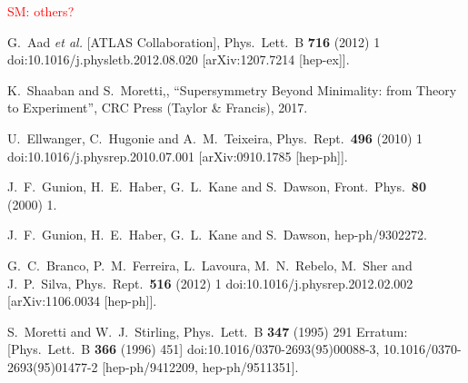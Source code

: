 \documentclass[12pt]{article}
\begin{document}
{\textcolor{red}{SM: others?}}


\begin{thebibliography}{99}

  G.~Aad {\it et al.} [ATLAS Collaboration],
  Phys.\ Lett.\ B {\bf 716} (2012) 1
  doi:10.1016/j.physletb.2012.08.020
  [arXiv:1207.7214 [hep-ex]].

  K.~Shaaban and S.~Moretti,,
  ``Supersymmetry Beyond Minimality: from Theory to Experiment'',
  CRC Press (Taylor \& Francis), 2017.

  U.~Ellwanger, C.~Hugonie and A.~M.~Teixeira,
  Phys.\ Rept.\  {\bf 496} (2010) 1
  doi:10.1016/j.physrep.2010.07.001
  [arXiv:0910.1785 [hep-ph]].


  J.~F.~Gunion, H.~E.~Haber, G.~L.~Kane and S.~Dawson,
  Front.\ Phys.\  {\bf 80} (2000) 1.


  J.~F.~Gunion, H.~E.~Haber, G.~L.~Kane and S.~Dawson,
  hep-ph/9302272.


  G.~C.~Branco, P.~M.~Ferreira, L.~Lavoura, M.~N.~Rebelo, M.~Sher and J.~P.~Silva,
  Phys.\ Rept.\  {\bf 516} (2012) 1
  doi:10.1016/j.physrep.2012.02.002
  [arXiv:1106.0034 [hep-ph]].


  S.~Moretti and W.~J.~Stirling,
  Phys.\ Lett.\ B {\bf 347} (1995) 291
   Erratum: [Phys.\ Lett.\ B {\bf 366} (1996) 451]
  doi:10.1016/0370-2693(95)00088-3, 10.1016/0370-2693(95)01477-2
  [hep-ph/9412209, hep-ph/9511351].



\end{thebibliography}
\end{document}
